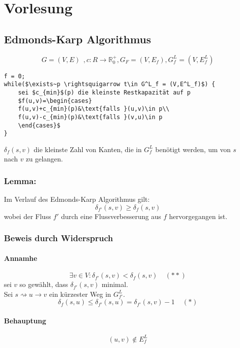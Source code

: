 \chapter{Vorlesung}
\section{Edmonds-Karp Algorithmus}
\[ G=(V,E)~~,c:R\rightarrow\mathbb{R}^+_0,G_F=(V,E_f), G^L_f=(V,E^L_f) \]
\begin{lstlisting}
f = 0;
while($\exists~p \rightsquigarrow t\in G^L_f = (V,E^L_f)$) {
	sei $c_{min}$(p) die kleinste Restkapazität auf p
	$f(u,v)=\begin{cases}
	f(u,v)+c_{min}(p)&\text{falls }(u,v)\in p\\
	f(u,v)-c_{min}(p)&\text{falls }(v,u)\in p
	\end{cases}$
} 
\end{lstlisting}
$\delta_f(s,v)$ die kleinste Zahl von Kanten, die in $G^L_f$ benötigt werden, um von $s$ nach $v$ zu gelangen.
\subsection{Lemma:}
Im Verlauf des Edmonds-Karp Algorithmus gilt:
\[ \delta_{f'}(s,v) \geq \delta_f(s,v) \]
wobei der Fluss $f'$ durch eine Flussverbesserung aus $f$ hervorgegangen ist.
\subsection{Beweis durch Widerspruch}
\subsubsection{Annamhe}
\[ \exists v\in V:\delta_{f'}(s,v)<\delta_f(s,v) ~~~~~(**)\]
sei $v$ so gewählt, dass $\delta_{f'}(s,v)$ minimal.\\
Sei $s\rightsquigarrow u\rightarrow v$ ein kürzester Weg in $G^L_{f'}$.
\[ \delta_f(s,u)\leq\delta_{f'}(s,u) = \delta_{f'}(s,v)-1~~~~~(*) \]
\subsubsection{Behauptung}
\[ (u,v) \notin E^L_f \]
